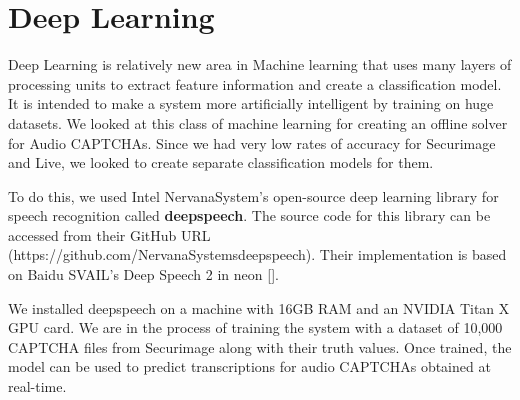 \section{Deep Learning}
\label{sec:deeplearning}

Deep Learning is relatively new area in Machine learning that uses many layers of processing units to extract feature information and create a classification model. It is intended to make a system more artificially intelligent by training on huge datasets. We looked at this class of machine learning for creating an offline solver for Audio CAPTCHAs. Since we had very low rates of accuracy for Securimage and Live, we looked to create separate classification models for them.\newline

To do this, we used Intel NervanaSystem's open-source deep learning library for speech recognition called \textbf{deepspeech}. The source code for this library can be accessed from their GitHub URL (https://github.com/NervanaSystems\newline deepspeech). Their implementation is based on Baidu SVAIL's Deep Speech 2 in neon [].\newline

We installed deepspeech on a machine with 16GB RAM and an NVIDIA Titan X GPU card. We are in the process of training the system with a dataset of 10,000 CAPTCHA files from Securimage along with their truth values. Once trained, the model can be used to predict transcriptions for audio CAPTCHAs obtained at real-time. 

